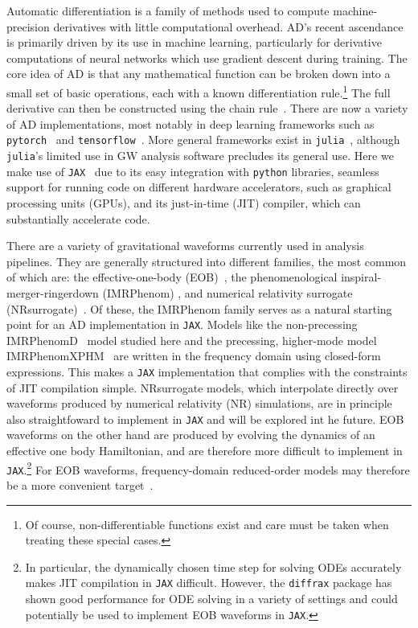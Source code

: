 \documentclass[twocolumn]{aastex631}
\newcommand{\jax}{\texttt{JAX}\xspace}
\begin{document}
Automatic differentiation is a family of methods used to compute machine-precision derivatives with little computational overhead. 
AD's recent ascendance is primarily driven by its use in machine learning, particularly for derivative computations of neural networks which use gradient descent during training.
The core idea of AD is that any mathematical function can be broken down into a small set of basic operations, each with a known differentiation rule.\footnote{
    Of course, non-differentiable functions exist and care must be taken when treating these special cases.
    }
The full derivative can then be constructed using the chain rule~\citep{2018arXiv181105031M}.
There are now a variety of AD implementations, most notably in deep learning frameworks such as \texttt{pytorch}~\citep{pytorch} and \texttt{tensorflow}~\citep{tensorflow2015-whitepaper}.
More general frameworks exist in \texttt{julia}~\citep{zygote, forwarddiff}, although \texttt{julia}'s limited use in GW analysis software precludes its general use.
Here we make use of \jax~\citep{jax2018github} due to its easy integration with \texttt{python} libraries, seamless support for running code on different hardware accelerators, such as graphical processing units (GPUs), and its just-in-time (JIT) compiler, which can substantially accelerate code.

There are a variety of gravitational waveforms currently used in analysis pipelines.
They are generally structured into different families, the most common of which are: the effective-one-body (EOB)~\citep{Damour:2008yg,Buonanno:2005xu, Buonanno:2000ef, Buonanno:1998gg, Damour:2000we,Ossokine:2020kjp,Nagar:2021gss,Ramos-Buades:2021adz,Albertini:2021tbt, Cotesta:2020qhw, Bohe:2016gbl}, the phenomenological inspiral-merger-ringerdown (IMRPhenom) \citep{Husa:2015iqa,Khan:2015jqa,Hannam:2013oca,Pratten:2020ceb, Smith:2016qas, Pratten:2020fqn, Garcia-Quiros:2020qpx}, and numerical relativity surrogate (NRsurrogate)~\citep{Blackman:2017pcm,Varma:2018mmi,Varma:2019csw}.
Of these, the IMRPhenom family serves as a natural starting point for an AD implementation in \jax.
Models like the non-precessing IMRPhenomD~\citep{Khan:2015jqa} model studied here and the precessing, higher-mode model IMRPhenomXPHM~\citep{Pratten:2020fqn, Pratten:2020ceb} are written in the frequency domain using closed-form expressions.
This makes a \jax implementation that complies with the constraints of JIT compilation simple.
NRsurrogate models, which interpolate directly over waveforms produced by numerical relativity (NR) simulations, are in principle also straightfoward to implement in \jax and will be explored int he future.
EOB waveforms on the other hand are produced by evolving the dynamics of an effective one body Hamiltonian, and are therefore more difficult to implement in \jax.\footnote{
    In particular, the dynamically chosen time step for solving ODEs accurately makes JIT compilation in \jax difficult. However, the \texttt{diffrax} package \citep{diffrax} has shown good performance for ODE solving in a variety of settings and could potentially be used to implement EOB waveforms in \jax.
    }
For EOB waveforms, frequency-domain reduced-order models may therefore be a more convenient target~\citep[e.g.,][]{Cotesta:2020qhw}.
\end{document}
